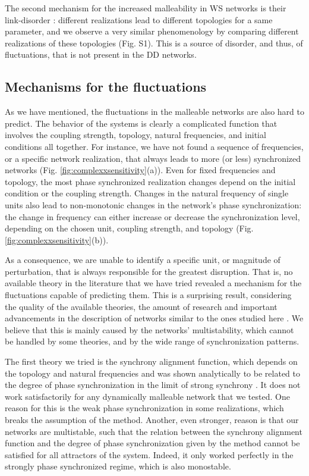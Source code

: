 The second mechanism for the increased malleability in WS networks is their link-disorder \cite{hong2013link}: different realizations lead to different topologies for a same parameter, and we observe a very similar phenomenology by comparing different realizations of these topologies (Fig. S1). This is a source of disorder, and thus, of fluctuations, that is not present in the DD networks. 


\subsection{Mechanisms for the fluctuations}
As we have mentioned, the fluctuations in the malleable networks are also hard to predict. The behavior of the systems is clearly a complicated function that involves the coupling strength, topology, natural frequencies, and initial conditions all together. For instance, we have not found a sequence of frequencies, or a specific network realization, that always leads to more (or less) synchronized networks (Fig. \ref{fig:complexxsensitivity}(a)). Even for fixed frequencies and topology, the most phase synchronized realization changes depend on the initial condition or the coupling strength. Changes in the natural frequency of single units also lead to non-monotonic changes in the network's phase synchronization: the change in frequency can either increase or decrease the synchronization level, depending on the chosen unit, coupling strength, and topology (Fig. \ref{fig:complexxsensitivity}(b)).

As a consequence, we are unable to identify a specific unit, or magnitude of perturbation, that is always responsible for the greatest disruption. That is, no available theory in the literature that we have tried revealed a mechanism for the fluctuations capable of predicting them. This is a surprising result, considering the quality of the available theories, the amount of research and important advancements in the description of networks similar to the ones studied here \cite{peter2018transition, skardal2014optimal, brede2008synchrony, carareto2009optimized}. We believe that this is mainly caused by the networks' multistability, which cannot be handled by some theories, and by the wide range of synchronization patterns. 

The first theory we tried is the synchrony alignment function, which depends on the topology and natural frequencies and was shown analytically to be related to the degree of phase synchronization in the limit of strong synchrony \cite{skardal2014optimal}. It does not work satisfactorily for any dynamically malleable network that we tested. One reason for this is the weak phase synchronization in some realizations, which breaks the assumption of the method. Another, even stronger, reason is that our networks are multistable, such that the relation between the synchrony alignment function and the degree of phase synchronization given by the method cannot be satisfied for all attractors of the system. Indeed, it only worked perfectly in the strongly phase synchronized regime, which is also monostable.

